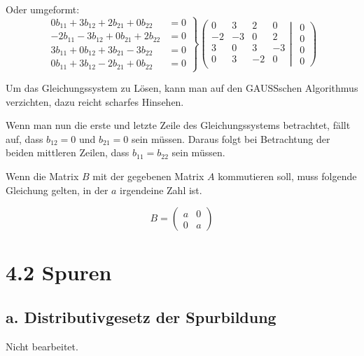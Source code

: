 \documentclass[a4paper,german,12pt,smallheadings]{scrartcl}
\begin{document}
Oder umgeformt:
\begin{equation*}
\left.
\begin{aligned}
 0b_{11} + 3b_{12} + 2b_{21} + 0b_{22} &= 0 \\
-2b_{11} - 3b_{12} + 0b_{21} + 2b_{22} &= 0 \\
 3b_{11} + 0b_{12} + 3b_{21} - 3b_{22} &= 0 \\
 0b_{11} + 3b_{12} - 2b_{21} + 0b_{22} &= 0
\end{aligned}
\right\}
\left(
 \begin{matrix}
  0 & 3 & 2 & 0\\
  -2 & -3 & 0 & 2 \\
  3 & 0 & 3 & -3 \\
  0 & 3 & -2 & 0 \\
 \end{matrix}
 \left|
  \hspace{5pt}
  \begin{matrix}
   0\\
   0\\
   0\\
   0
  \end{matrix}
 \right)
\right.
\end{equation*}

Um das Gleichungssystem zu Lösen, kann man auf den \textsc{GAUSS}schen
Algorithmus verzichten, dazu reicht scharfes Hinsehen.

Wenn man nun die erste und letzte Zeile des Gleichungssystems betrachtet, fällt
auf, dass $b_{12} = 0$ und $b_{21} = 0$ sein müssen. Daraus folgt bei
Betrachtung der beiden mittleren Zeilen, dass $b_{11} = b_{22}$ sein müssen.

Wenn die Matrix $B$ mit der gegebenen Matrix $A$ kommutieren soll, muss
folgende Gleichung gelten, in der $a$ irgendeine Zahl ist.

\begin{equation*}
B
=
\begin{pmatrix}
a & 0 \\
0 & a
\end{pmatrix}
\end{equation*}

\section*{4.2 Spuren}
\subsection*{a. Distributivgesetz der Spurbildung}
Nicht bearbeitet.
\end{document}
